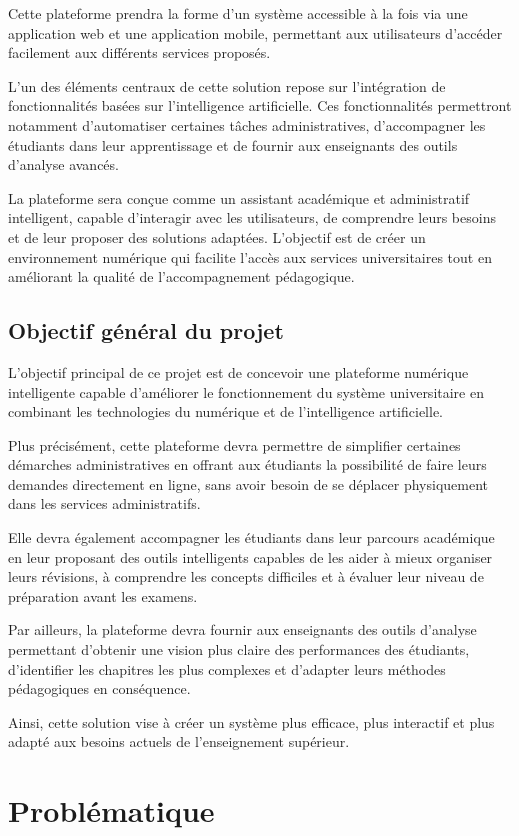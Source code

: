 \documentclass[12pt,a4paper]{report}
\begin{document}
Cette plateforme prendra la forme d'un système accessible à la fois via une application web et une application mobile, permettant aux utilisateurs d'accéder facilement aux différents services proposés.

L'un des éléments centraux de cette solution repose sur l'intégration de fonctionnalités basées sur l'intelligence artificielle. Ces fonctionnalités permettront notamment d'automatiser certaines tâches administratives, d'accompagner les étudiants dans leur apprentissage et de fournir aux enseignants des outils d'analyse avancés.

La plateforme sera conçue comme un assistant académique et administratif intelligent, capable d'interagir avec les utilisateurs, de comprendre leurs besoins et de leur proposer des solutions adaptées. L'objectif est de créer un environnement numérique qui facilite l'accès aux services universitaires tout en améliorant la qualité de l'accompagnement pédagogique.

\section{Objectif général du projet}
L'objectif principal de ce projet est de concevoir une plateforme numérique intelligente capable d'améliorer le fonctionnement du système universitaire en combinant les technologies du numérique et de l'intelligence artificielle.

Plus précisément, cette plateforme devra permettre de simplifier certaines démarches administratives en offrant aux étudiants la possibilité de faire leurs demandes directement en ligne, sans avoir besoin de se déplacer physiquement dans les services administratifs.

Elle devra également accompagner les étudiants dans leur parcours académique en leur proposant des outils intelligents capables de les aider à mieux organiser leurs révisions, à comprendre les concepts difficiles et à évaluer leur niveau de préparation avant les examens.

Par ailleurs, la plateforme devra fournir aux enseignants des outils d'analyse permettant d'obtenir une vision plus claire des performances des étudiants, d'identifier les chapitres les plus complexes et d'adapter leurs méthodes pédagogiques en conséquence.

Ainsi, cette solution vise à créer un système plus efficace, plus interactif et plus adapté aux besoins actuels de l'enseignement supérieur.


\chapter{Problématique}
\end{document}
